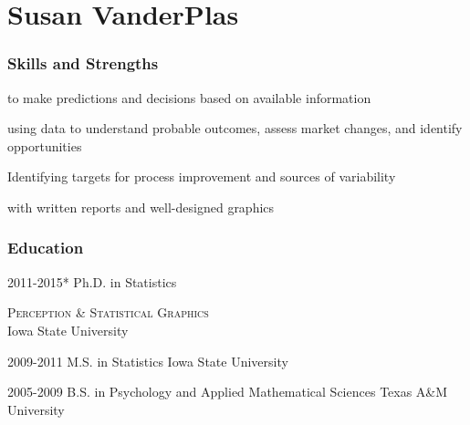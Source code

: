 \documentclass[10pt]{tccv}
\begin{document}
\part{Susan VanderPlas}

\section{Skills and Strengths}
\begin{description}[leftmargin=*]
\item [Statistical modeling] to make predictions and decisions based on available information
\item [Risk assessment,] using data to understand probable outcomes, assess market changes, and identify opportunities
\item [Optimization] Identifying targets for process improvement and sources of variability
\item [Communicating and summarizing information] with written reports and well-designed graphics
\end{description}


\section{Education}
\begin{yearlist}
\item{2011-2015*}
     {Ph.D. in Statistics}
     {\begin{minipage}{.32\textwidth}\textsc{\small Perception \& Statistical Graphics}\\ Iowa State University\end{minipage}}
\item{2009-2011}
     {M.S. in Statistics}
     {Iowa State University}
\item{2005-2009}
     {B.S. in Psychology and Applied Mathematical Sciences}
     {Texas A\&M University}
\end{yearlist}
\end{document}
